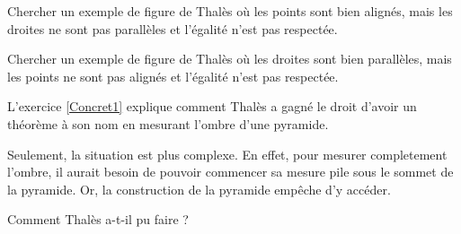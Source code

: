

Chercher un exemple de figure de Thalès où les points sont bien alignés, mais les droites ne sont pas parallèles et l'égalité n'est pas respectée.


Chercher un exemple de figure de Thalès où les droites sont bien parallèles, mais les points ne sont pas alignés et l'égalité n'est pas respectée.


L'exercice \ref{Concret1} explique comment Thalès a gagné le droit d'avoir un théorème à son nom en mesurant l'ombre d'une pyramide. 

Seulement, la situation est plus complexe. En effet, pour mesurer completement l'ombre, il aurait besoin de pouvoir commencer sa mesure pile sous le sommet de la pyramide. Or, la construction de la pyramide empêche d'y accéder.

Comment Thalès a-t-il pu faire ?